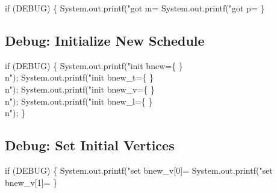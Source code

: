 \nwenddocs{}\endmoddef\nwstartdeflinemarkup{}\nwenddeflinemarkup
if (DEBUG) \{
  System.out.printf("got m=%
  System.out.printf("got p=%
\}
\nwendcode{}\nwdocspar

\subsection{Debug: Initialize New Schedule}

\nwenddocs{}\endmoddef\nwstartdeflinemarkup{}\nwenddeflinemarkup
if (DEBUG) \{
  System.out.printf("init bnew=\{ \}\\n");
  System.out.printf("init bnew_t=\{ \}\\n");
  System.out.printf("init bnew_v=\{ \}\\n");
  System.out.printf("init bnew_l=\{ \}\\n");
\}
\nwendcode{}\nwdocspar

\subsection{Debug: Set Initial Vertices}

\nwenddocs{}\endmoddef\nwstartdeflinemarkup{}\nwenddeflinemarkup
if (DEBUG) \{
  System.out.printf("set bnew_v[0]=%
  System.out.printf("set bnew_v[1]=%
\}
\nwendcode{}\nwdocspar

